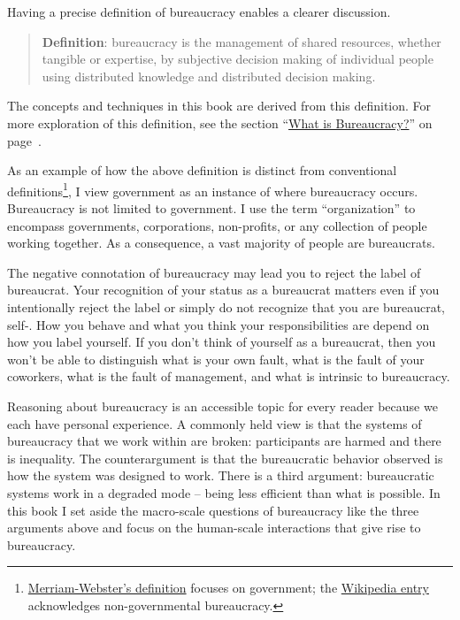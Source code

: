 Having a precise definition of bureaucracy enables a clearer discussion. 
\begin{quote}
\textbf{Definition}: \Gls{bureaucracy} is the management of shared resources, whether tangible or expertise, by subjective decision making of individual people using distributed knowledge and distributed decision making. 
\end{quote}

The concepts and techniques in this book are derived from this definition. For more exploration of this definition, see the section ``\hyperref[sec:define-bureaucracy]{What is Bureaucracy?}'' on page~\pageref{sec:define-bureaucracy}.

As an example of how the above definition is distinct from conventional definitions\footnote{\href{https://www.merriam-webster.com/dictionary/bureaucracy}{Merriam-Webster's definition} focuses on government; the \href{https://www.merriam-webster.com/dictionary/bureaucracy}{Wikipedia entry} acknowledges non-governmental bureaucracy.}, I view government as an instance of where bureaucracy occurs. Bureaucracy is not limited to government. I use the term ``organization'' to encompass governments, corporations, non-profits, or any collection of people working together. As a consequence, a vast majority of people are bureaucrats. 

The negative connotation of bureaucracy may lead you to reject the label of bureaucrat. Your recognition of your status as a bureaucrat matters even if you intentionally reject the label or simply do not recognize that you are bureaucrat, self-. How you behave and what you think your responsibilities are depend on how you label yourself.
If you don't think of yourself as a bureaucrat, then you won't be able to distinguish what is your own fault, what is the fault of your coworkers, what is the fault of management, and what is intrinsic to bureaucracy. 

Reasoning about bureaucracy is an accessible topic for every reader because we each have personal experience.
A commonly held view is that the systems of bureaucracy that we work within are broken: participants are harmed and there is inequality. 
The counterargument is that the bureaucratic behavior observed is how the system was designed to work. There is a third argument: bureaucratic systems work in a degraded mode -- being less efficient than what is possible. 
In this book I set aside the macro-scale questions of bureaucracy like the three arguments above and focus on the human-scale interactions that give rise to bureaucracy.

